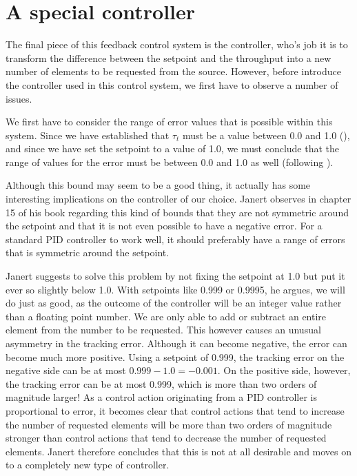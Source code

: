 \section{A special controller}
\label{subsec:controller-design}
The final piece of this feedback control system is the controller, who's job it is to transform the difference between the setpoint and the throughput into a new number of elements to be requested from the source. However, before introduce the controller used in this control system, we first have to observe a number of issues.

We first have to consider the range of error values that is possible within this system. Since we have established that $\tau_t$ must be a value between 0.0 and 1.0 (), and since we have set the setpoint to a value of 1.0, we must conclude that the range of values for the error must be between 0.0 and 1.0 as well (following ). 

Although this bound may seem to be a good thing, it actually has some interesting implications on the controller of our choice. Janert observes in chapter 15 of his book \cite{janert2013-feedback} regarding this kind of bounds that they are not symmetric around the setpoint and that it is not even possible to have a negative error. For a standard PID controller to work well, it should preferably have a range of errors that is symmetric around the setpoint.

Janert suggests to solve this problem by not fixing the setpoint at 1.0 but put it ever so slightly below 1.0. With setpoints like 0.999 or 0.9995, he argues, we will do just as good, as the outcome of the controller will be an integer value rather than a floating point number. We are only able to add or subtract an entire element from the number to be requested. This however causes an unusual asymmetry in the tracking error. Although it can become negative, the error can become much more positive. Using a setpoint of 0.999, the tracking error on the negative side can be at most $0.999 - 1.0 = -0.001$. On the positive side, however, the tracking error can be at most 0.999, which is more than two orders of magnitude larger! As a control action originating from a PID controller is proportional to error, it becomes clear that control actions that tend to increase the number of requested elements will be more than two orders of magnitude stronger than control actions that tend to decrease the number of requested elements. Janert therefore concludes that this is not at all desirable and moves on to a completely new type of controller.

